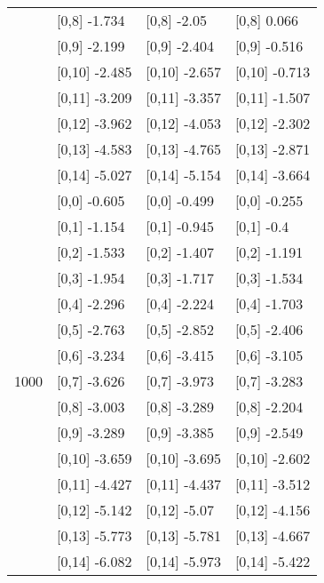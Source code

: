 \begin{table}
\begin{tabular}[t]{llll}
 & {}[0,8] -1.734 & {}[0,8] -2.05 & {}[0,8] 0.066\\
 & {}[0,9] -2.199 & {}[0,9] -2.404 & {}[0,9] -0.516\\
\addlinespace
 & {}[0,10] -2.485 & {}[0,10] -2.657 & {}[0,10] -0.713\\
 & {}[0,11] -3.209 & {}[0,11] -3.357 & {}[0,11] -1.507\\
 & {}[0,12] -3.962 & {}[0,12] -4.053 & {}[0,12] -2.302\\
 & {}[0,13] -4.583 & {}[0,13] -4.765 & {}[0,13] -2.871\\
 & {}[0,14] -5.027 & {}[0,14] -5.154 & {}[0,14] -3.664\\
\addlinespace
 & {}[0,0] -0.605 & {}[0,0] -0.499 & {}[0,0] -0.255\\
 & {}[0,1] -1.154 & {}[0,1] -0.945 & {}[0,1] -0.4\\
 & {}[0,2] -1.533 & {}[0,2] -1.407 & {}[0,2] -1.191\\
 & {}[0,3] -1.954 & {}[0,3] -1.717 & {}[0,3] -1.534\\
 & {}[0,4] -2.296 & {}[0,4] -2.224 & {}[0,4] -1.703\\
\addlinespace
 & {}[0,5] -2.763 & {}[0,5] -2.852 & {}[0,5] -2.406\\
 & {}[0,6] -3.234 & {}[0,6] -3.415 & {}[0,6] -3.105\\
1000 & {}[0,7] -3.626 & {}[0,7] -3.973 & {}[0,7] -3.283\\
 & {}[0,8] -3.003 & {}[0,8] -3.289 & {}[0,8] -2.204\\
 & {}[0,9] -3.289 & {}[0,9] -3.385 & {}[0,9] -2.549\\
\addlinespace
 & {}[0,10] -3.659 & {}[0,10] -3.695 & {}[0,10] -2.602\\
 & {}[0,11] -4.427 & {}[0,11] -4.437 & {}[0,11] -3.512\\
 & {}[0,12] -5.142 & {}[0,12] -5.07 & {}[0,12] -4.156\\
 & {}[0,13] -5.773 & {}[0,13] -5.781 & {}[0,13] -4.667\\
 & {}[0,14] -6.082 & {}[0,14] -5.973 & {}[0,14] -5.422\\
\bottomrule
\end{tabular}
\end{table}
